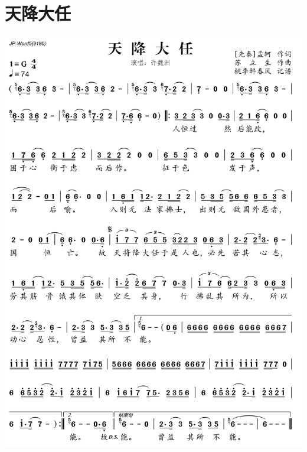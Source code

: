 \documentclass[cn,pad,twocol]{elegantbook}
\begin{document}
\section{天降大任}\includegraphics[width=\textwidth]{rpi400/20210124天降大任.png}
\end{document}
